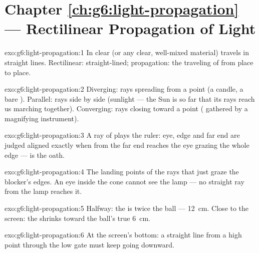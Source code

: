 \section*{Chapter \ref{ch:g6:light-propagation} --- Rectilinear Propagation of Light}

\begin{solution}{exo:g6:light-propagation:1}
In clear  (or any clear, well-mixed material)  travels in
straight lines. Rectilinear: straight-lined; propagation: the
traveling of  from place to place.
\end{solution}

\begin{solution}{exo:g6:light-propagation:2}
Diverging: rays spreading from a point (a candle, a bare ).
Parallel: rays side by side (sunlight --- the Sun is so far that
its rays reach us marching together). Converging: rays closing
toward a point ( gathered by a magnifying instrument).
\end{solution}

\begin{solution}{exo:g6:light-propagation:3}
A ray of  plays the ruler: eye, edge and far end are judged
aligned exactly when  from the far end reaches the eye
grazing the whole edge ---  is the oath.
\end{solution}

\begin{solution}{exo:g6:light-propagation:4}
The landing points of the rays that just graze the blocker's
edges. An eye inside the  cone cannot see the lamp --- no
straight ray from the lamp reaches it.
\end{solution}

\begin{solution}{exo:g6:light-propagation:5}
Halfway: the  is twice the ball --- \qty{12}{cm}. Close to
the screen: the  shrinks toward the ball's true
\qty{6}{cm}.
\end{solution}

\begin{solution}{exo:g6:light-propagation:6}
At the screen's bottom: a straight line from a high point through
the low gate must keep going downward.
\end{solution}

